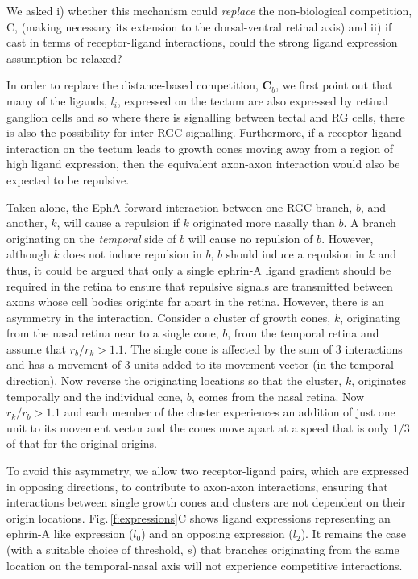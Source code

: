 \documentclass[11pt, a4paper]{article}
\begin{document}
We asked i) whether this mechanism could \emph{replace} the non-biological
competition, C, (making necessary its extension to the dorsal-ventral retinal
axis) and ii) if cast in terms of receptor-ligand interactions, could the
strong ligand expression assumption be relaxed?





In order to replace the distance-based competition, $\mathbf{C}_b$, we first
point out that many of the ligands, $l_i$, expressed on the tectum are also
expressed by retinal ganglion cells and so where there is signalling between
tectal and RG cells, there is also the possibility for inter-RGC
signalling. Furthermore, if a receptor-ligand interaction on the tectum leads
to growth cones moving away from a region of high ligand expression, then the
equivalent axon-axon interaction would also be expected to be repulsive.

Taken alone, the EphA forward interaction between one RGC branch, $b$, and
another, $k$, will cause a repulsion if $k$ originated more nasally than
$b$. A branch originating on the \emph{temporal} side of $b$ will cause no
repulsion of $b$. However, although $k$ does not induce repulsion in $b$, $b$
should induce a repulsion in $k$ and thus, it could be argued that only a
single ephrin-A ligand gradient should be required in the retina to ensure
that repulsive signals are transmitted between axons whose cell bodies
originte far apart in the retina. However, there is an asymmetry in the
interaction. Consider a cluster of growth cones, $k$, originating from the
nasal retina near to a single cone, $b$, from the temporal retina and assume
that $r_b/r_k>1.1$. The single cone is affected by the sum of 3 interactions
and has a movement of 3 units added to its movement vector (in the temporal
direction). Now reverse the originating locations so that the cluster, $k$,
originates temporally and the individual cone, $b$, comes from the nasal
retina. Now $r_k/r_b>1.1$ and each member of the cluster experiences an
addition of just one unit to its movement vector and the cones move apart at a
speed that is only $1/3$ of that for the original origins.

To avoid this asymmetry, we allow two receptor-ligand pairs, which are
expressed in opposing directions, to contribute to axon-axon interactions,
ensuring that interactions between single growth cones and clusters are not
dependent on their origin locations. Fig.\,\ref{f:expressions}C shows ligand
expressions representing an ephrin-A like expression ($l_0$) and an opposing
expression ($l_2$). It remains the case (with a suitable choice of threshold,
$s$) that branches originating from the same location on the temporal-nasal
axis will not experience competitive interactions.
\end{document}
